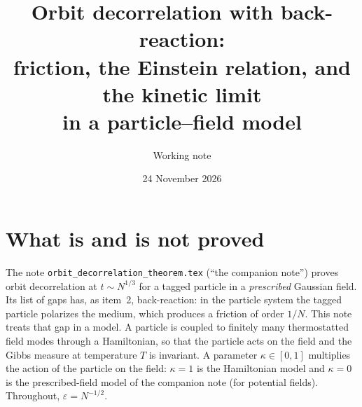\documentclass[11pt]{article}
\title{Orbit decorrelation with back-reaction:\\
friction, the Einstein relation, and the kinetic limit\\
in a particle--field model}
\author{Working note}
\date{24 November 2026}
\newcommand{\eps}{\varepsilon}
\theoremstyle{remark}
\begin{document}
\maketitle

\section{What is and is not proved}

The note \texttt{orbit\_decorrelation\_theorem.tex} (``the companion note'')
proves orbit decorrelation at $t\sim N^{1/3}$ for a tagged particle in a
\emph{prescribed} Gaussian field. Its list of gaps has, as item~2,
back-reaction: in the particle system the tagged particle polarizes the
medium, which produces a friction of order $1/N$. This note treats that gap
in a model. A particle is coupled to finitely many thermostatted field modes
through a Hamiltonian, so that the particle acts on the field and the Gibbs
measure at temperature $T$ is invariant. A parameter $\kappa\in[0,1]$
multiplies the action of the particle on the field: $\kappa=1$ is the
Hamiltonian model and $\kappa=0$ is the prescribed-field model of the
companion note (for potential fields). Throughout, $\eps=N^{-1/2}$.
\end{document}
